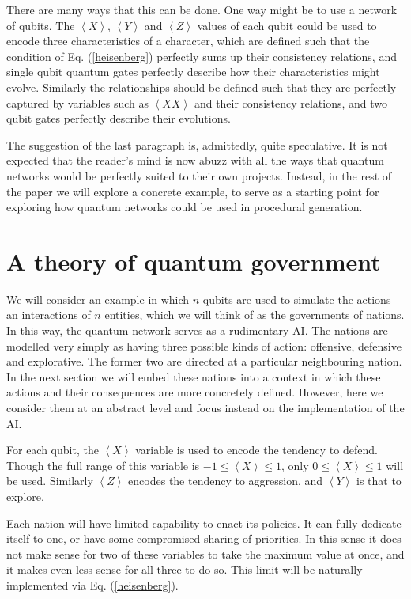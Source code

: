 \documentclass[conference]{IEEEtran}
\begin{document}
There are many ways that this can be done. One way might be to use a network of qubits. The $\left\langle X\right\rangle$, $\left\langle Y\right\rangle$ and $\left\langle Z\right\rangle$  values of each qubit could be used to encode three characteristics of a character, which are defined such that the condition of Eq. (\ref{heisenberg}) perfectly sums up their consistency relations, and single qubit quantum gates perfectly describe how their characteristics might evolve. Similarly the relationships should be defined such that they are perfectly captured by variables such as $\left\langle XX \right\rangle$ and their consistency relations, and two qubit gates perfectly describe their evolutions.

The suggestion of the last paragraph is, admittedly, quite speculative. It is not expected that the reader's mind is now abuzz with all the ways that quantum networks would be perfectly suited to their own projects. Instead, in the rest of the paper we will explore a concrete example, to serve as a starting point for exploring how quantum networks could be used in procedural generation.

\section{A theory of quantum government}

We will consider an example in which $n$ qubits are used to simulate the actions an interactions of $n$ entities, which we will think of as the governments of nations. In this way, the quantum network serves as a rudimentary AI. The nations are modelled very simply as having three possible kinds of action: offensive, defensive and explorative. The former two are directed at a particular neighbouring nation. In the next section we will embed these nations into a context in which these actions and their consequences are more concretely defined. However, here we consider them at an abstract level and focus instead on the implementation of the AI.

For each qubit, the $\left\langle X\right\rangle$ variable is used to encode the tendency to defend. Though the full range of this variable is $-1 \leq \left\langle X\right\rangle \leq 1$, only $0 \leq \left\langle X\right\rangle \leq 1$ will be used. Similarly $\left\langle Z\right\rangle$ encodes the tendency to aggression, and $\left\langle Y\right\rangle$ is that to explore.

Each nation will have limited capability to enact its policies. It can fully dedicate itself to one, or have some compromised sharing of priorities. In this sense it does not make sense for two of these variables to take the maximum value at once, and it makes even less sense for all three to do so. This limit will be naturally implemented via Eq. (\ref{heisenberg}).
\end{document}
